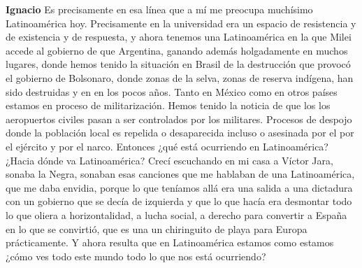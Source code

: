 \documentclass[
  spanish,
  11pt,
  a4paper,
]{scrbook}
\newenvironment{transcripcion}{
    \begin{list}{}{
        \setlength{\leftmargin}{1.5em}  %
        \setlength{\rightmargin}{0em}
        \setlength{\itemsep}{0.2em}     %
        \setlength{\parsep}{0.0em}
        \setlength{\listparindent}{0pt}
    }
}{
    \end{list}
}
\newcommand{\personaje}[1]{\textbf{#1}\quad}
\begin{document}
\begin{transcripcion}
\item \personaje{Ignacio} Es precisamente en esa línea que a mí me preocupa muchísimo Latinoamérica hoy. Precisamente en la universidad era un espacio de resistencia y de existencia y de respuesta, y ahora tenemos una Latinoamérica en la que Milei accede al gobierno de que Argentina, ganando además holgadamente en muchos lugares, donde hemos tenido la situación en Brasil de la destrucción que provocó el gobierno de Bolsonaro, donde zonas de la selva, zonas de reserva indígena, han sido destruidas y en en los pocos años. Tanto en México como en otros países estamos en proceso de militarización. Hemos tenido la noticia de que los los aeropuertos civiles pasan a ser controlados por los militares. Procesos de despojo donde la población local es repelida o desaparecida incluso o asesinada por el por el ejército y por el narco. Entonces ¿qué está ocurriendo en Latinoamérica? ¿Hacia dónde va Latinoamérica? Crecí escuchando en mi casa a Víctor Jara, sonaba la Negra, sonaban esas canciones que me hablaban de una Latinoamérica, que me daba envidia, porque lo que teníamos allá era una salida a una dictadura con un gobierno que se decía de izquierda y que lo que hacía era desmontar todo lo que oliera a horizontalidad, a lucha social, a derecho para convertir a España en lo que se convirtió, que es una un chiringuito de playa para Europa prácticamente. Y ahora resulta que en Latinoamérica estamos como estamos ¿cómo ves todo este mundo todo lo que nos está ocurriendo?


\end{transcripcion}
\end{document}
